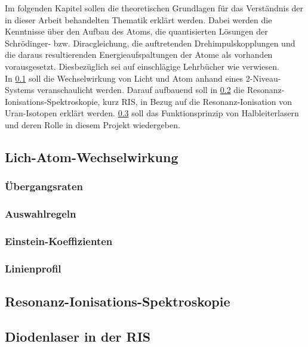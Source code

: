 Im folgenden Kapitel sollen die theoretischen Grundlagen für das Verständnis der
in dieser Arbeit behandelten Thematik erklärt werden. Dabei werden die
Kenntnisse über den Aufbau des Atoms, die quantisierten Lösungen der
Schrödinger- bzw. Diracgleichung, die auftretenden Drehimpulskopplungen und die
daraus resultierenden Energieaufspaltungen der Atome als vorhanden
vorausgesetzt. Diesbezüglich sei auf einschlägige Lehrbücher wie
\cite{demtroeder:ex3} verwiesen.\\
In \ref{subsec:licht-atom-wechselwirkung} soll die Wechselwirkung von Licht
und Atom anhand eines 2-Niveau-Systems veranschaulicht werden. Darauf aufbauend soll
in \ref{subsec:ris} die Resonanz-Ionisations-Spektroskopie,
kurz RIS, in Bezug auf die Resonanz-Ionisation von Uran-Isotopen erklärt
werden. \ref{subsec:diodenlaser} soll das Funktionsprinzip von
Halbleiterlasern und deren Rolle in diesem Projekt wiedergeben.

\subsection{Lich-Atom-Wechselwirkung}\label{subsec:licht-atom-wechselwirkung}



\subsubsection{Übergangsraten}\label{subsec:uebergangsraten}

\subsubsection{Auswahlregeln}\label{subsec:auswahlregeln}

\subsubsection{Einstein-Koeffizienten}\label{subsec:einstein-koeffizienten}

\subsubsection{Linienprofil}\label{subsec:linienprofil}

\subsection{Resonanz-Ionisations-Spektroskopie}\label{subsec:ris}

\subsection{Diodenlaser in der RIS}\label{subsec:diodenlaser}
